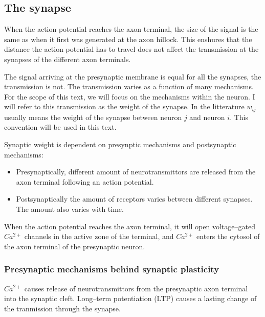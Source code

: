 \subsection{The synapse}
When the action potential reaches the axon terminal, the size of the signal is the same as when it first was generated at the axon hillock.
This enshures that the distance the action potential has to travel does not affect the transmission at the synapses of the different axon terminals. \cite{?}

The signal arriving at the presynaptic membrane is equal for all the synapses, the transmission is not. The transmission varies as a function of many mechanisms.
For the scope of this text, we will focus on the mechanisms within the neuron. I will refer to this transmission as the weight of the synapse. 
In the litterature $w_{ij}$ usually means the weight of the synapse between neuron $j$ and neuron $i$. This convention will be used in this text. 

Synaptic weight is dependent on presynptic mechanisms and postsynaptic mechanisms:

\begin{itemize}
	\item Presynaptically, different amount of neurotransmittors are released from the axon terminal following an action potential.
	\item Postsynaptically the amount of receptors varies between different synapses. The amount also varies with time.%
\end{itemize}

When the action potential reaches the axon terminal, it will open voltage--gated $Ca^{2+}$ channels in the active zone of the terminal, and $Ca^{2+}$ enters the cytosol of the axon terminal of the presynaptic neuron\cite{PrinciplesOfNeuralScience4edKAP10}.


\subsubsection{Presynaptic mechanisms behind synaptic plasticity}
$Ca^{2+}$ causes release of neurotransmittors from the presynaptic axon terminal into the synaptic cleft\cite{PrinciplesOfNeuralScience4edKAP10}. 
Long--term potentiation (LTP) causes a lasting change of the tranmission through the synapse.%

